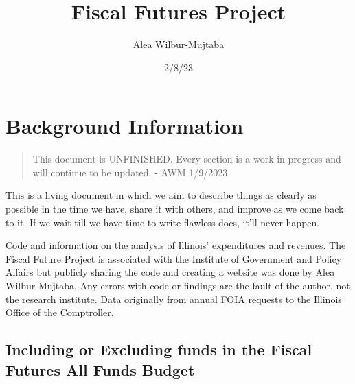 \documentclass[
  letterpaper,
  DIV=11,
  numbers=noendperiod]{scrreport}
\title{Fiscal Futures Project}
\author{Alea Wilbur-Mujtaba}
\date{2/8/23}
\renewcommand*\contentsname{Table of contents}
\newcommand\contentsname{Table of contents}
\begin{document}
\maketitle
\ifdefined\Shaded\renewenvironment{Shaded}{\begin{tcolorbox}[sharp corners, enhanced, interior hidden, frame hidden, borderline west={3pt}{0pt}{shadecolor}, boxrule=0pt, breakable]}{\end{tcolorbox}}\fi

\renewcommand*\contentsname{Table of contents}
{
\hypersetup{linkcolor=}
\setcounter{tocdepth}{2}
\tableofcontents
}

\hypertarget{sec-background-info}{%
\chapter*{Background Information}\label{sec-background-info}}


\begin{quote}
This document is UNFINISHED. Every section is a work in progress and
will continue to be updated. - AWM 1/9/2023
\end{quote}

This is a living document in which we aim to describe things as clearly
as possible in the time we have, share it with others, and improve as we
come back to it. If we wait till we have time to write flawless docs,
it'll never happen.

Code and information on the analysis of Illinois' expenditures and
revenues. The Fiscal Future Project is associated with the Institute of
Government and Policy Affairs but publicly sharing the code and creating
a website was done by Alea Wilbur-Mujtaba. Any errors with code or
findings are the fault of the author, not the research institute. Data
originally from annual FOIA requests to the Illinois Office of the
Comptroller.

\hypertarget{including-or-excluding-funds-in-the-fiscal-futures-all-funds-budget}{%
\section*{Including or Excluding funds in the Fiscal Futures All Funds
Budget}\label{including-or-excluding-funds-in-the-fiscal-futures-all-funds-budget}}
\end{document}
